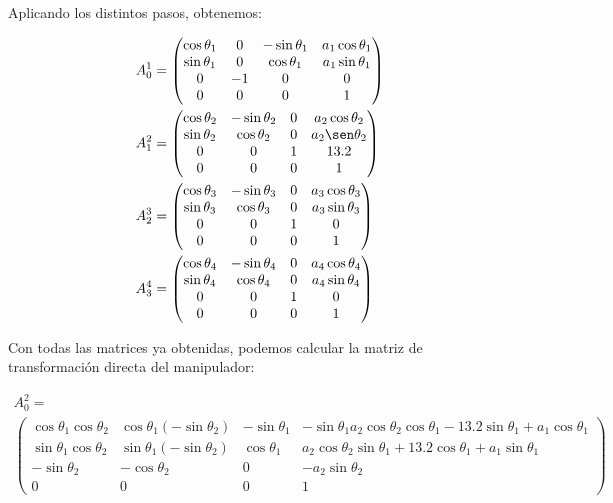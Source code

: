 \documentclass[a4paper,12pt]{article}
\begin{document}
Aplicando los distintos pasos, obtenemos:

\begin{align*}
    A_0^1 &= 
    \begin{pmatrix}
        \cos\theta_1 & 0 & -\sin\theta_1 & a_1\cos\theta_1 \\
        \sin\theta_1 & 0 & \cos\theta_1 & a_1\sin\theta_1 \\
        0 & -1 & 0 & 0 \\
        0 & 0 & 0 & 1
    \end{pmatrix} \\
    A_1^2 &= 
    \begin{pmatrix}
        \cos\theta_2 & -\sin\theta_2 & 0 & a_2\cos\theta_2 \\
        \sin\theta_2 & \cos\theta_2 & 0 & a_2\sen\theta_2 \\
        0 & 0 & 1 & 13.2 \\
        0 & 0 & 0 & 1
    \end{pmatrix} \\
    A_2^3 &= 
    \begin{pmatrix}
        \cos\theta_3 & -\sin\theta_3 & 0 & a_3\cos\theta_3 \\
        \sin\theta_3 & \cos\theta_3 & 0 & a_3\sin\theta_3 \\
        0 & 0 & 1 & 0 \\
        0 & 0 & 0 & 1
    \end{pmatrix} \\
    A_3^4 &=
    \begin{pmatrix}
        \cos\theta_4 & -\sin\theta_4 & 0 & a_4\cos\theta_4 \\
        \sin\theta_4 & \cos\theta_4 & 0 & a_4\sin\theta_4 \\
        0 & 0 & 1 & 0 \\
        0 & 0 & 0 & 1
    \end{pmatrix}
\end{align*}

Con todas las matrices ya obtenidas, podemos calcular la matriz de
transformación directa del manipulador:

\begin{align*}
    A_0^2 = \\
    \begin{pmatrix}
        \cos\theta_1\cos\theta_2 & \cos\theta_1(-\sin\theta_2) & -\sin\theta_1 & -\sin\theta_1 a_2\cos\theta_2\cos\theta_1 - 13.2\sin\theta_1 + a_1\cos\theta_1 \\
        \sin\theta_1\cos\theta_2 & \sin\theta_1(-\sin\theta_2) & \cos\theta_1 & a_2\cos\theta_2\sin\theta_1 + 13.2\cos\theta_1 + a_1\sin\theta_1 \\
        -\sin\theta_2 & -\cos\theta_2 & 0 & -a_2\sin\theta_2 \\
        0 & 0 & 0 & 1
    \end{pmatrix}
\end{align*}

\newpage
\printbibliography
\end{document}
